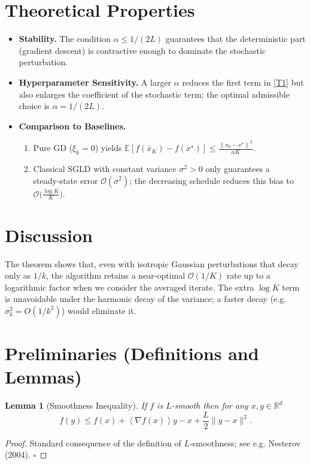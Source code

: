 \documentclass[11pt]{article}
\newtheorem{lemma}{Lemma}
\newcommand{\EE}{\mathbb{E}}
\newcommand{\RR}{\mathbb{R}}
\newcommand{\norm}[1]{\left\lVert #1\right\rVert}
\newcommand{\inner}[1]{\left\langle #1\right\rangle}
\begin{document}
\section*{Theoretical Properties}
\begin{itemize}
\item \textbf{Stability.} The condition $\alpha\le 1/(2L)$ guarantees that the deterministic part (gradient descent) is contractive enough to dominate the stochastic perturbation.
\item \textbf{Hyperparameter Sensitivity.} A larger $\alpha$ reduces the first term in \eqref{T1} but also enlarges the coefficient of the stochastic term; the optimal admissible choice is $\alpha=1/(2L)$.
\item \textbf{Comparison to Baselines.}
  \begin{enumerate}
    \item Pure GD ($\xi_{k}=0$) yields $\EE[f(\bar{x}_{K})-f(x^{\star})]\le \frac{\norm{x_{0}-x^{\star}}^{2}}{\alpha K}$.
    \item Classical SGLD with constant variance $\sigma^{2}>0$ only guarantees a steady‑state error $\mathcal O(\sigma^{2})$; the decreasing schedule reduces this bias to $\mathcal O\big(\tfrac{\log K}{K}\big)$.
  \end{enumerate}
\end{itemize}

\section*{Discussion}
The theorem shows that, even with isotropic Gaussian perturbations that decay only as $1/k$, the algorithm retains a near‑optimal $\mathcal O(1/K)$ rate up to a logarithmic factor when we consider the averaged iterate. The extra $\log K$ term is unavoidable under the harmonic decay of the variance; a faster decay (e.g. $\sigma_{k}^{2}=O(1/k^{2})$) would eliminate it.

\newpage
\section*{Preliminaries (Definitions and Lemmas)}
\begin{lemma}[Smoothness Inequality]\label{lem:smooth}
If $f$ is $L$‑smooth then for any $x,y\in\RR^{d}$
\[
f(y)\le f(x)+\inner{\nabla f(x)}{y-x}+\frac{L}{2}\|y-x\|^{2}.
\tag{L1}
\]
\end{lemma}
\begin{proof}
Standard consequence of the definition of $L$‑smoothness; see e.g. Nesterov (2004). \hfill $\square$
\end{proof}
\end{document}
